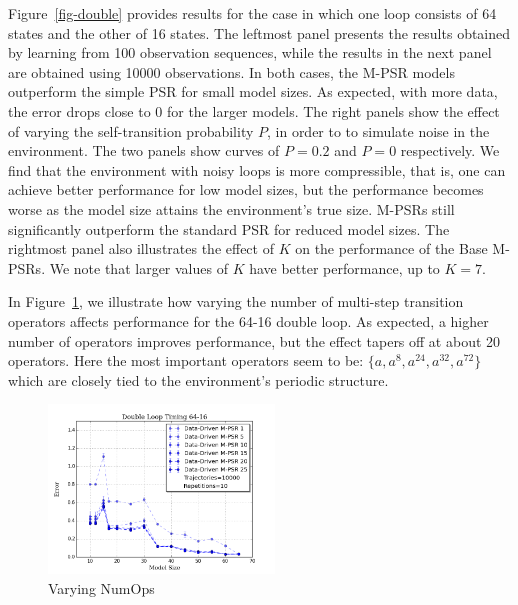 
Figure~\ref{fig-double} provides results for the case in which one loop consists of 64 states and the other of 16 states. The leftmost panel presents the results obtained by learning from  100 observation sequences, while the results in the next panel are obtained using 10000 observations. In both cases, the M-PSR models outperform the simple PSR for small model sizes.  As expected, with more data, the error drops close to 0 for the larger models.  The right panels show the effect of 
varying the self-transition probability $P$, in order to to simulate noise in the environment. The two panels show curves of $P=0.2$ and $P=0$ respectively. We find that the environment with noisy loops is more compressible, that is, one can achieve better performance for low model sizes, but the performance becomes worse as the model size attains the environment's true size. M-PSRs still significantly outperform the standard PSR for reduced model sizes.  The rightmost panel also illustrates the effect of $K$ on the performance of the Base M-PSRs. We note that larger values of $K$ have better performance, up to $K=7$.



In Figure~\ref{fig-numops}, we illustrate how varying the number of multi-step transition operators affects performance for the 64-16 double loop. As expected, a higher number of operators improves performance, but the effect tapers off  at about 20 operators. Here the most important operators seem to be: $\{a,a^{8},a^{24},a^{32},a^{72}\}$ which are closely tied to the environment's periodic structure.

\begin{figure}[ht!]
\centering
\includegraphics[width=60mm]{uCOREPICS/DL/NumOpsTiming.png}
\caption{Varying NumOps\label{fig-numops}}
\end{figure} 





